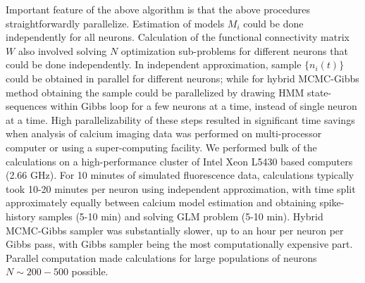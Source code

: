 Important feature of the above algorithm is that the above procedures straightforwardly parallelize. Estimation of models $M_i$ could be done independently for all neurons. Calculation of the functional connectivity matrix $W$ also involved solving $N$ optimization sub-problems for different neurons that could be done independently. In independent approximation, sample $\{ n_i(t)\}$ could be obtained in parallel for different neurons; while for hybrid MCMC-Gibbs method obtaining the sample could be parallelized by drawing HMM state-sequences within Gibbs loop for a few neurons at a time, instead of single neuron at a time. High parallelizability of these steps resulted in significant time savings when analysis of calcium imaging data was performed on multi-processor computer or using a super-computing facility.  We performed bulk of the calculations on a high-performance cluster of Intel Xeon L5430 based computers (2.66 GHz). For 10 minutes of simulated fluorescence data, calculations typically took 10-20 minutes per neuron using independent approximation, with time split approximately equally between calcium model estimation and obtaining spike-history samples (5-10 min) and solving GLM problem (5-10 min). Hybrid MCMC-Gibbs sampler was substantially slower, up to an hour per neuron per Gibbs pass, with Gibbs sampler being the most computationally expensive part. Parallel computation made calculations for large populations of neurons $N\sim 200-500$ possible.
